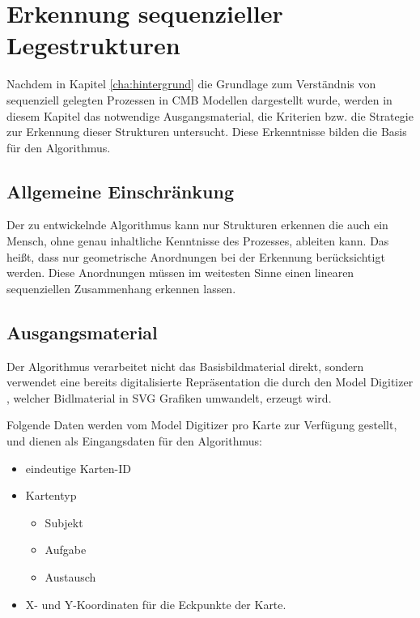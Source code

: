 %
%
% 
% 
% 

\chapter{Erkennung sequenzieller Legestrukturen} %
\label{cha:erkennung}
Nachdem in Kapitel \ref{cha:hintergrund} die Grundlage zum Verständnis von sequenziell gelegten Prozessen in CMB Modellen  dargestellt wurde, werden in diesem Kapitel das notwendige Ausgangsmaterial, die Kriterien bzw. die Strategie zur Erkennung dieser Strukturen untersucht. Diese Erkenntnisse bilden die Basis für den Algorithmus.

\section{Allgemeine Einschränkung} %
\label{sec:allgmeine_einschrankung}
Der zu entwickelnde Algorithmus kann nur Strukturen erkennen die auch ein Mensch, ohne genau inhaltliche Kenntnisse des Prozesses, ableiten kann. Das heißt, dass nur geometrische Anordnungen bei der Erkennung berücksichtigt werden. Diese Anordnungen müssen im weitesten Sinne einen linearen sequenziellen Zusammenhang erkennen lassen.

\section{Ausgangsmaterial} %
\label{sec:ausgangsmeterial}
Der Algorithmus verarbeitet nicht das Basisbildmaterial direkt, sondern verwendet eine bereits digitalisierte Repräsentation die durch den Model Digitizer \cite{opplstary2017}, welcher Bidlmaterial in SVG Grafiken umwandelt, erzeugt wird.

Folgende Daten werden vom Model Digitizer pro Karte zur Verfügung gestellt, und dienen als Eingangsdaten für den Algorithmus:
\begin{itemize}
	\item eindeutige Karten-ID
	\item Kartentyp
	\begin{itemize}
		\item Subjekt
		\item Aufgabe
		\item Austausch
	\end{itemize}
	\item X- und Y-Koordinaten für die Eckpunkte der Karte. 
\end{itemize}

